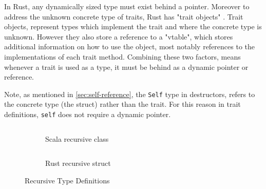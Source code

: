 \documentclass[ oneside,%
                    author={James Elgar},
                    degree={MEng},
                     title={Bidirectional transformer between functional and \\ object-oriented programming in Rust},
                  subtitle={}]{dissertation}
\newcommand{\rust}[1]{\texttt{#1}}
\newcommand{\codefile}[2]{\inputminted[xleftmargin=20pt,linenos, breaklines]{#1}{#2}}
\newcommand{\rustfile}[1]{\codefile{rust}{../#1.rs}}
\newcommand{\rustexample}[1]{\rustfile{examples/src/#1}}
\begin{document}
In Rust, any dynamically sized type must exist behind a pointer. Moreover to address the unknown concrete type of traits, Rust has "trait objects" \cite{rustonomicon}. Trait objects, represent types which implement the trait and where the concrete type is unknown. However they also store a reference to a "vtable", which stores additional information on how to use the object, most notably references to the implementations of each trait method. Combining these two factors, means whenever a trait is used as a type, it must be behind as a dynamic pointer or reference.

Note, as mentioned in \autoref{sec:self-reference}, the \rust{Self} type in destructors, refers to the concrete type (the struct) rather than the trait. For this reason in trait definitions, \rust{self} does not require a dynamic pointer.

\begin{figure}
\centering
\begin{subfigure}{.5\textwidth}
    \codefile{scala}{../scala/examples/src/main/scala/RecursiveType.scala}
    \caption{Scala recursive class}
    \label{fig:recursive-typedef-scala}
\end{subfigure}%
\begin{subfigure}{.5\textwidth}
    \rustexample{list/oop}
    \caption{Rust recursive struct}
    \label{fig:recursive-typedef-rust}
\end{subfigure}
\caption{Recursive Type Definitions}
\label{fig:recursive-typedef}
\end{figure}





\end{document}
